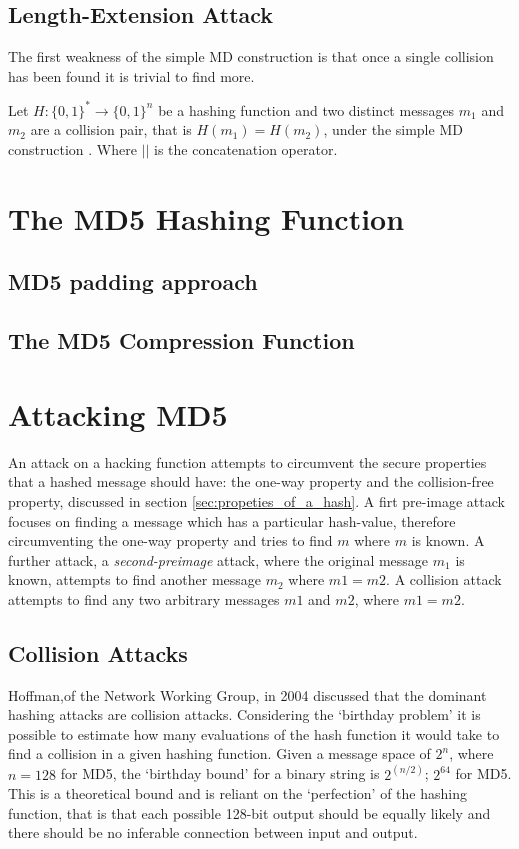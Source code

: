 \documentclass[a4paper,12pt]{article}
\newcommand{\hash}[1]{#1}
\begin{document}
\subsection{Length-Extension Attack}
The first weakness of the simple MD construction is that once a single collision has been found it is trivial to find more\cite{Sasaki2006}. 

Let $H: \{0,1\}^* \rightarrow \{0,1\}^n$ be a hashing function and two distinct messages $m_1$ and $m_2$ are a collision pair, that is $H(m_1) = H(m_2)$, under the simple MD construction . Where $||$ is the concatenation operator.

\section{The MD5 Hashing Function}
\subsection{MD5 padding approach}
\label{sec:md5pad}
\subsection{The MD5 Compression Function}

\section{Attacking MD5}
An attack on a hacking function attempts to circumvent the secure properties that a hashed message should have: the one-way property and the collision-free property, discussed in section \ref{sec:propeties_of_a_hash}.
A firt pre-image attack focuses on finding a message which has a particular hash-value, therefore circumventing the one-way property and tries to find $m$ where $\hash{m}$ is known. A further attack, a \emph{second-preimage} attack, where the original message $m_1$ is known, attempts to find another message $m_2$ where $\hash{m1} = \hash{m2}$.
A collision attack attempts to find any two arbitrary messages $m1$ and $m2$, where $\hash{m1} = \hash{m2}$.

\subsection{Collision Attacks}
Hoffman,of the Network Working Group, in 2004 discussed that the dominant hashing attacks are collision attacks. Considering the `birthday problem' it is possible to estimate how many evaluations of the hash function it would take to find a collision in a given hashing function. Given a message space of  $2^n$, where $n = 128$ for MD5, the `birthday bound' for a binary string is $2^{(n/2)}$; $2^64$ for MD5. This is a theoretical bound and is reliant on the `perfection' of the hashing function, that is that each possible 128-bit output should be equally likely and there should be no inferable connection between input and output. 
\end{document}
